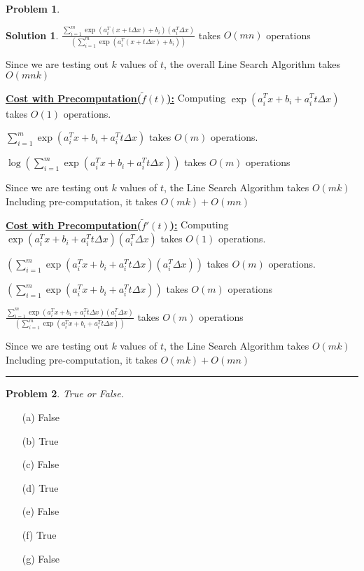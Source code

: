 \documentclass{article}
\theoremstyle{definition}
\newtheorem{problem}{Problem}
\def\fline{\rule{0.75\linewidth}{0.5pt}}
\newcommand{\finishline}{\begin{center}\fline\end{center}}
\newtheorem*{solution*}{Solution}
\newenvironment{solution}{\begin{solution*}}{{\finishline} \end{solution*}}
\begin{document}
\begin{problem}
\begin{enumerate}
\begin{solution}
        $\frac{\sum_{i=1}^{m} \exp(a_i^T(x + t\Delta x) + b_i) (a_i^T \Delta x)}{(\sum_{i=1}^{m} \exp(a_i^T(x + t\Delta x) + b_i))}$ takes $O(mn)$ operations

                        
        Since we are testing out $k$ values of $t$, the overall Line Search Algorithm takes $O(mnk)$ \newline 
        
        
        \textbf{\underline{Cost with Precomputation($\tilde{f}(t)$):}} \newline 
        Computing $\exp(a_i^Tx + b_i + a_i^T t\Delta x)$ takes $O(1)$ operations. 
        
        $\sum_{i=1}^{m} \exp(a_i^Tx + b_i + a_i^T t\Delta x)$ takes $O(m)$ operations. 

        $\log(\sum_{i=1}^{m} \exp(a_i^Tx + b_i + a_i^T t\Delta x))$ takes $O(m)$ operations
        
        Since we are testing out $k$ values of $t$, the Line Search Algorithm takes $O(mk)$ \newline 
        Including pre-computation, it takes $O(mk) + O(mn)$ \newline 
        
        \textbf{\underline{Cost with Precomputation($\tilde{f}'(t)$):}} \newline 
        Computing $\exp(a_i^Tx + b_i + a_i^T t\Delta x) (a_i^T \Delta x)$ takes $O(1)$ operations.
        
        $(\sum_{i=1}^{m} \exp(a_i^Tx + b_i + a_i^T t\Delta x) (a_i^T \Delta x))$ takes $O(m)$ operations. 

        $(\sum_{i=1}^{m} \exp(a_i^Tx + b_i + a_i^T t\Delta x))$ takes $O(m)$ operations

        $\frac{\sum_{i=1}^{m} \exp(a_i^Tx + b_i + a_i^T t\Delta x) (a_i^T \Delta x)}{(\sum_{i=1}^{m} \exp(a_i^Tx + b_i + a_i^T t\Delta x))}$ takes $O(m)$ operations
        
        Since we are testing out $k$ values of $t$, the Line Search Algorithm takes $O(mk)$ \newline 
    Including pre-computation, it takes $O(mk) + O(mn)$ \newline 
    \end{solution}
    
\end{enumerate}

\end{problem}

\begin{problem}
\textit{True or False.} 

\begin{enumerate}
\item[(a)] False
\item[(b)] True
\item[(c)] False
\item[(d)] True
\item[(e)] False
\item[(f)] True
\item[(g)] False
\end{enumerate}
\end{problem}
\end{document}
